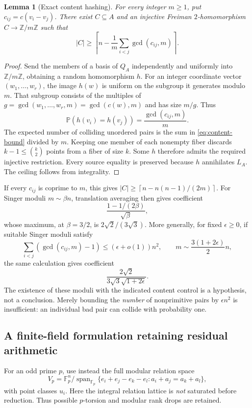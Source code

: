 \documentclass[11pt]{article}
\newtheorem{lemma}[theorem]{Lemma}
\theoremstyle{definition}
\theoremstyle{remark}
\newcommand{\Z}{\mathbb Z}
\newcommand{\F}{\mathbb F}
\newcommand{\Prob}{\mathbb P}
\newcommand{\ceil}[1]{\left\lceil #1\right\rceil}
\begin{document}
\begin{lemma}[Exact content hashing]\label{lem:content-hash}
For every integer $m\ge1$, put $c_{ij}=c(v_i-v_j)$. There exist
$C\subseteq A$ and an injective Freiman $2$-homomorphism
$C\to\Z/m\Z$ such that
\begin{equation}\label{eq:content-bound}
|C|\ge\ceil{n-\frac1m\sum_{i<j}\gcd(c_{ij},m)}.
\end{equation}
\end{lemma}
\begin{proof}
Send the members of a basis of $Q_A$ independently and uniformly into
$\Z/m\Z$, obtaining a random homomorphism $h$. For an integer coordinate
vector $(w_1,\ldots,w_r)$, the image $h(w)$ is uniform on the subgroup
it generates modulo $m$. That subgroup consists of the multiples of
$g=\gcd(w_1,\ldots,w_r,m)=\gcd(c(w),m)$ and has size $m/g$.
Thus
\[
\Prob(h(v_i)=h(v_j))=\frac{\gcd(c_{ij},m)}m.
\]
The expected number of colliding unordered pairs is the sum in
\eqref{eq:content-bound} divided by $m$. Keeping one member of each
nonempty fiber discards $k-1\le\binom k2$ points from a fiber of size
$k$. Some $h$ therefore admits the required injective restriction.
Every source equality is preserved because $h$ annihilates $L_A$.
The ceiling follows from integrality.
\end{proof}

If every $c_{ij}$ is coprime to $m$, this gives
$|C|\ge\ceil{n-n(n-1)/(2m)}$. For Singer moduli $m\sim\beta n$,
translation averaging then gives coefficient
\[
\frac{1-1/(2\beta)}{\sqrt\beta},
\]
whose maximum, at $\beta=3/2$, is $2\sqrt2/(3\sqrt3)$.
More generally, for fixed $\epsilon\ge0$, if suitable Singer moduli satisfy
\[
\sum_{i<j}(\gcd(c_{ij},m)-1)\le(\epsilon+o(1))n^2,
\qquad m\sim\frac{3(1+2\epsilon)}2n,
\]
the same calculation gives coefficient
\[
\frac{2\sqrt2}{3\sqrt3\sqrt{1+2\epsilon}}.
\]
The existence of these moduli with the indicated content control is a
hypothesis, not a conclusion. Merely bounding the \emph{number} of
nonprimitive pairs by $\epsilon n^2$ is insufficient: an individual
bad pair can collide with probability one.

\subsection{A finite-field formulation retaining residual arithmetic}

For an odd prime $p$, use instead the full modular relation space
\[
V_p=\F_p^n/\operatorname{span}_{\F_p}
\{e_i+e_j-e_k-e_l:a_i+a_j=a_k+a_l\},
\]
with point classes $u_i$. Here the integral relation lattice is
\emph{not} saturated before reduction. Thus possible $p$-torsion and
modular rank drops are retained.
\end{document}
